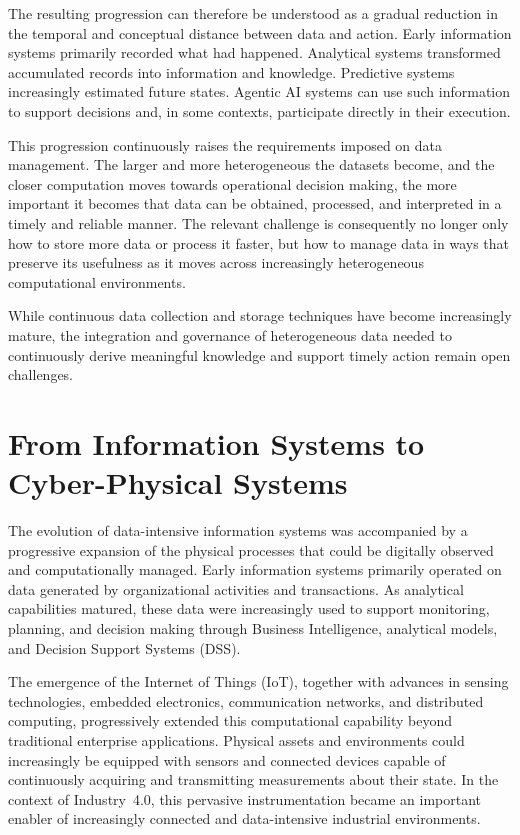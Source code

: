 The resulting progression can therefore be understood as a gradual reduction in the temporal and conceptual distance between data and action. Early information systems primarily recorded what had happened. Analytical systems transformed accumulated records into information and knowledge. Predictive systems increasingly estimated future states. Agentic AI systems can use such information to support decisions and, in some contexts, participate directly in their execution.

This progression continuously raises the requirements imposed on data management. The larger and more heterogeneous the datasets become, and the closer computation moves towards operational decision making, the more important it becomes that data can be obtained, processed, and interpreted in a timely and reliable manner. The relevant challenge is consequently no longer only how to store more data or process it faster, but how to manage data in ways that preserve its usefulness as it moves across increasingly heterogeneous computational environments.

While continuous data collection and storage techniques have become increasingly mature, the integration and governance of heterogeneous data needed to continuously derive meaningful knowledge and support timely action remain open challenges.

\section{From Information Systems to Cyber-Physical Systems}

\label{sec:dss_to_cps}


The evolution of data-intensive information systems was accompanied by a progressive expansion of the physical processes that could be digitally observed and computationally managed. Early information systems primarily operated on data generated by organizational activities and transactions. As analytical capabilities matured, these data were increasingly used to support monitoring, planning, and decision making through Business Intelligence, analytical models, and Decision Support Systems (DSS).

The emergence of the Internet of Things (IoT), together with advances in sensing technologies, embedded electronics, communication networks, and distributed computing, progressively extended this computational capability beyond traditional enterprise applications. Physical assets and environments could increasingly be equipped with sensors and connected devices capable of continuously acquiring and transmitting measurements about their state. In the context of Industry~4.0, this pervasive instrumentation became an important enabler of increasingly connected and data-intensive industrial environments.

